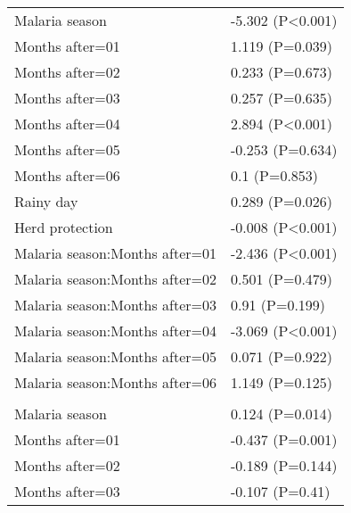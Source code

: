 \documentclass[]{article}
\begin{document}
\begin{longtable}[t]{ll}
\hspace{1em}Malaria season & -5.302 (P<0.001)\\
\hspace{1em}Months after=01 & 1.119 (P=0.039)\\
\hspace{1em}Months after=02 & 0.233 (P=0.673)\\
\hspace{1em}Months after=03 & 0.257 (P=0.635)\\
\hspace{1em}Months after=04 & 2.894 (P<0.001)\\
\hspace{1em}Months after=05 & -0.253 (P=0.634)\\
\hspace{1em}Months after=06 & 0.1 (P=0.853)\\
\hspace{1em}Rainy day & 0.289 (P=0.026)\\
\hspace{1em}Herd protection & -0.008 (P<0.001)\\
\hspace{1em}Malaria season:Months after=01 & -2.436 (P<0.001)\\
\hspace{1em}Malaria season:Months after=02 & 0.501 (P=0.479)\\
\hspace{1em}Malaria season:Months after=03 & 0.91 (P=0.199)\\
\hspace{1em}Malaria season:Months after=04 & -3.069 (P<0.001)\\
\hspace{1em}Malaria season:Months after=05 & 0.071 (P=0.922)\\
\hspace{1em}Malaria season:Months after=06 & 1.149 (P=0.125)\\
\addlinespace[1.5em]
\multicolumn{2}{l}{\textbf{Temporary field worker}}\\
\hspace{1em}Malaria season & 0.124 (P=0.014)\\
\hspace{1em}Months after=01 & -0.437 (P=0.001)\\
\hspace{1em}Months after=02 & -0.189 (P=0.144)\\
\hspace{1em}Months after=03 & -0.107 (P=0.41)\\

\end{longtable}
\end{document}
